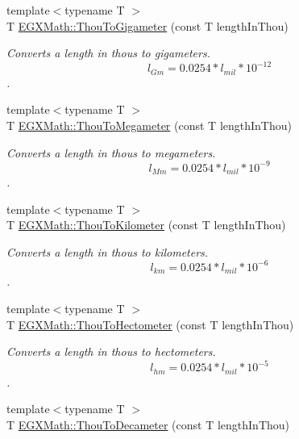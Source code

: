 \begin{DoxyCompactItemize}
{\footnotesize template$<$typename T $>$ }\\T \mbox{\hyperlink{group___e_g_x_math-_conversions-_length_conversions-_imperial-_thou-_s_i_ga53354dce1cb2e9b136520fa3cf836305}{E\+G\+X\+Math\+::\+Thou\+To\+Gigameter}} (const T length\+In\+Thou)
\begin{DoxyCompactList}\small\item\em Converts a length in thous to gigameters. \[ l_{Gm}=0.0254 * l_{mil} * 10^{-12} \]. \end{DoxyCompactList}\item 
{\footnotesize template$<$typename T $>$ }\\T \mbox{\hyperlink{group___e_g_x_math-_conversions-_length_conversions-_imperial-_thou-_s_i_ga774f8033626b121ccaf369950df3dd1e}{E\+G\+X\+Math\+::\+Thou\+To\+Megameter}} (const T length\+In\+Thou)
\begin{DoxyCompactList}\small\item\em Converts a length in thous to megameters. \[ l_{Mm}=0.0254 * l_{mil} * 10^{-9} \]. \end{DoxyCompactList}\item 
{\footnotesize template$<$typename T $>$ }\\T \mbox{\hyperlink{group___e_g_x_math-_conversions-_length_conversions-_imperial-_thou-_s_i_ga659ca5f57bc87f49d568df8a3abb5ed3}{E\+G\+X\+Math\+::\+Thou\+To\+Kilometer}} (const T length\+In\+Thou)
\begin{DoxyCompactList}\small\item\em Converts a length in thous to kilometers. \[ l_{km}=0.0254 * l_{mil} * 10^{-6} \]. \end{DoxyCompactList}\item 
{\footnotesize template$<$typename T $>$ }\\T \mbox{\hyperlink{group___e_g_x_math-_conversions-_length_conversions-_imperial-_thou-_s_i_ga6493263a0400fe1dfa4ef0ab50be59de}{E\+G\+X\+Math\+::\+Thou\+To\+Hectometer}} (const T length\+In\+Thou)
\begin{DoxyCompactList}\small\item\em Converts a length in thous to hectometers. \[ l_{hm}=0.0254 * l_{mil} * 10^{-5} \]. \end{DoxyCompactList}\item 
{\footnotesize template$<$typename T $>$ }\\T \mbox{\hyperlink{group___e_g_x_math-_conversions-_length_conversions-_imperial-_thou-_s_i_gab03dfc8772a388c93d1504f2b1c5717a}{E\+G\+X\+Math\+::\+Thou\+To\+Decameter}} (const T length\+In\+Thou)

\end{DoxyCompactItemize}
